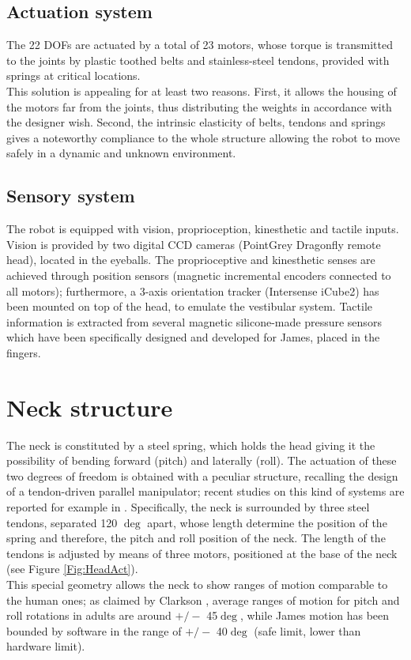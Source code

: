 \documentclass[conference]{IEEEtran}
\numberwithin{equation}{section}
\begin{document}
\subsection{Actuation system}

The 22 DOFs are actuated by a total of 23 motors, whose torque is transmitted to the joints by plastic toothed belts and stainless-steel tendons, provided with springs at critical locations.\\This solution is appealing for at least two reasons. First, it allows the housing of the motors far from the joints, thus distributing the weights in accordance with the designer wish. Second, the intrinsic elasticity of belts, tendons and springs gives a noteworthy compliance to the whole structure allowing the robot to move safely in a dynamic and unknown environment.

\subsection{Sensory system}

The robot is equipped with vision, proprioception, kinesthetic and tactile inputs. Vision is provided by two digital CCD cameras (PointGrey Dragonfly remote head), located in the eyeballs. The proprioceptive and kinesthetic senses are achieved through position sensors (magnetic incremental encoders connected to all motors); furthermore, a 3-axis orientation tracker (Intersense iCube2) has been mounted on top of the head, to emulate the vestibular system. Tactile information is extracted from several magnetic silicone-made pressure sensors which have been specifically designed and developed for James, placed in the fingers.

\section{Neck structure} \label{Sec:NeckStructure}

The neck is constituted by a steel spring, which holds the head giving it the possibility of bending forward (pitch) and laterally (roll). The actuation of these two degrees of freedom is obtained with a peculiar structure, recalling the design of a tendon-driven parallel manipulator; recent studies on this kind of systems are reported for example in \cite{Verhoeven00parallel,Hay05parallel}. Specifically, the neck is surrounded by three steel tendons, separated 120 $\deg$ apart, whose length determine the position of the spring and therefore, the pitch and roll position of the neck. The length of the tendons is adjusted by means of three motors, positioned at the base of the neck (see Figure \ref{Fig:HeadAct}).\\This special geometry allows the neck to show ranges of motion comparable to the human ones; as claimed by Clarkson \cite{Clarkson00skeleton}, average ranges of motion for pitch and roll rotations in adults are around $+/-$ 45$\deg$, while James motion has been bounded by software in the range of $+/-$ 40$\deg$ (safe limit, lower than hardware limit).
\end{document}
